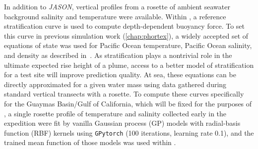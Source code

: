 In addition to \emph{JASON}, vertical profiles from a rosette of ambient seawater background salinity and temperature were available. Within \PHUMES, a reference stratification curve is used to compute depth-dependent buoyancy force. To set this curve in previous simulation work (\cref{chap:phortex}), a widely accepted set of equations of state was used for Pacific Ocean temperature, Pacific Ocean salinity, and density as described in~\cite{speer1989model}. As stratification plays a nontrivial role in the ultimate expected rise height of a plume, access to a better model of stratification for a test site will improve prediction quality. At sea, these equations can be directly approximated for a given water mass using data gathered during standard vertical transects with a rosette. To compute these curves specifically for the Guaymas Basin/Gulf of California, which will be fixed for the purposes of \PHUMES, a single rosette profile of temperature and salinity collected early in the expedition were fit by vanilla Gaussian process (GP) models with radial-basis function (RBF) kernels using \verb|GPytorch| \autocite{gardner2018gpytorch} (100 iterations, learning rate 0.1), and the trained mean function of those models was used within \PHUMES.

